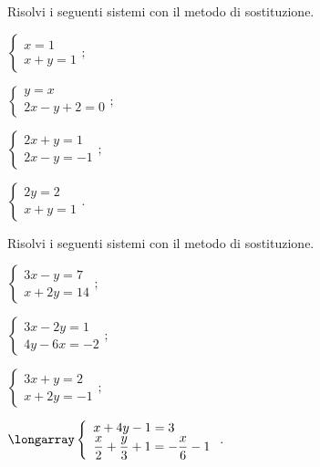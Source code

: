 \begin{esercizio}[\Ast]
 \label{ese:22.8}
Risolvi i seguenti sistemi con il metodo di sostituzione.
 \begin{multicols}{2}
 \begin{enumeratea}
  \item $\left\{\begin{array}{l}
        x=1\\
        x+y=1
       \end{array}
\right.;$
\item $\left\{\begin{array}{l}
        y=x\\
        2x-y+2=0
       \end{array}\right.;$
\item $\left\{\begin{array}{l}
		2x+y=1\\
		2x-y=-1
	  \end{array}\right.;$
\item $\left\{\begin{array}{l}
	   2y=2\\
	   x+y=1
	\end{array}\right..$
 \end{enumeratea}
 \end{multicols}
\end{esercizio}
\begin{esercizio}[\Ast]
 \label{ese:22.9}
Risolvi i seguenti sistemi con il metodo di sostituzione.
 \begin{multicols}{2}
 \begin{enumeratea}
  \item $\left\{\begin{array}{l}3x-y=7\\x+2y=14\end{array}\right.;$
\item $\left\{\begin{array}{l}3x-2y=1\\4y-6x=-2\end{array}\right.;$
\item $\left\{\begin{array}{l}3x+y=2\\x+2y=-1\end{array}\right.;$
\item ${\longarray\left\{\begin{array}{l}x+4y-1=3\\
	\dfrac{x}{2}+\dfrac{y}{3}+1=-{\dfrac{x}{6}}-1
	\end{array}\right..}$
 \end{enumeratea}
 \end{multicols}
\end{esercizio}

